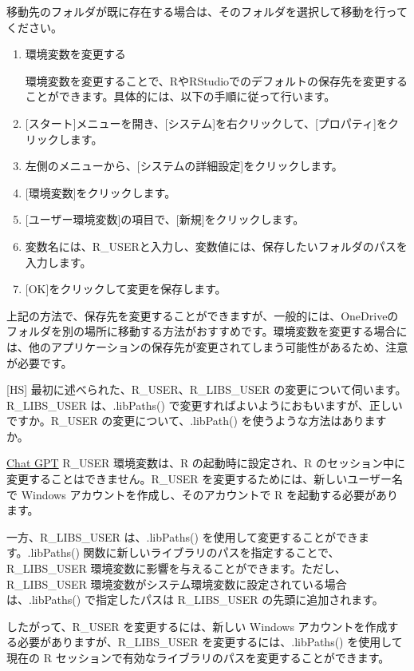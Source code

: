 \documentclass[
]{bxjsbook}
\theoremstyle{definition}
\theoremstyle{definition}
\theoremstyle{definition}
\theoremstyle{definition}
\theoremstyle{remark}
\begin{document}
移動先のフォルダが既に存在する場合は、そのフォルダを選択して移動を行ってください。

\begin{enumerate}
\def\labelenumi{\arabic{enumi}.}
\setcounter{enumi}{1}
\item
  環境変数を変更する

  環境変数を変更することで、RやRStudioでのデフォルトの保存先を変更することができます。具体的には、以下の手順に従って行います。
\item
  {[}スタート{]}メニューを開き、{[}システム{]}を右クリックして、{[}プロパティ{]}をクリックします。
\item
  左側のメニューから、{[}システムの詳細設定{]}をクリックします。
\item
  {[}環境変数{]}をクリックします。
\item
  {[}ユーザー環境変数{]}の項目で、{[}新規{]}をクリックします。
\item
  変数名には、R\_USERと入力し、変数値には、保存したいフォルダのパスを入力します。
\item
  {[}OK{]}をクリックして変更を保存します。
\end{enumerate}

上記の方法で、保存先を変更することができますが、一般的には、OneDriveのフォルダを別の場所に移動する方法がおすすめです。環境変数を変更する場合には、他のアプリケーションの保存先が変更されてしまう可能性があるため、注意が必要です。

{[}HS{]} 最初に述べられた、R\_USER、R\_LIBS\_USER の変更について伺います。R\_LIBS\_USER は、.libPaths() で変更すればよいようにおもいますが、正しいですか。R\_USER の変更について、.libPath() を使うような方法はありますか。

\protect\hyperlink{chatgpt}{Chat GPT} R\_USER 環境変数は、R の起動時に設定され、R のセッション中に変更することはできません。R\_USER を変更するためには、新しいユーザー名で Windows アカウントを作成し、そのアカウントで R を起動する必要があります。

一方、R\_LIBS\_USER は、.libPaths() を使用して変更することができます。.libPaths() 関数に新しいライブラリのパスを指定することで、R\_LIBS\_USER 環境変数に影響を与えることができます。ただし、R\_LIBS\_USER 環境変数がシステム環境変数に設定されている場合は、.libPaths() で指定したパスは R\_LIBS\_USER の先頭に追加されます。

したがって、R\_USER を変更するには、新しい Windows アカウントを作成する必要がありますが、R\_LIBS\_USER を変更するには、.libPaths() を使用して現在の R セッションで有効なライブラリのパスを変更することができます。
\end{document}
